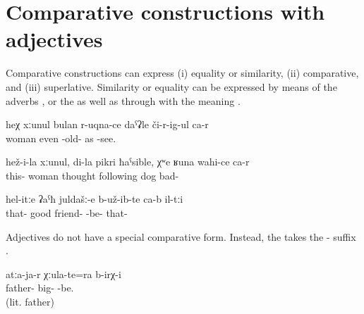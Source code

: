 
\section{Comparative constructions with adjectives}
\label{sec:Comparison}

Comparative constructions can express (i) equality or similarity, (ii) comparative, and (iii) superlative. Similarity or equality can be expressed by means of the adverbs   ,   or the    as well as through  with the meaning  .

\begin{exe}
	\ex	\label{ex:There is even a woman who looks old}
	\gll	heχ	xːunul	bulan	r-uqna-ce	daˁʡle	či-r-ig-ul ca-r \\
			woman	even	-old-	as	-see.  \\
	\glt	{}

	\ex	\label{ex:His wife, in my mind, is bad like a dog}
	\gll	hež-i-la	xːunul,	di-la	pikri	ħaˁsible, χʷe	ʁuna	wahi-ce	ca-r \\
		this-	woman		thought	following	dog		bad-	 \\
	\glt	{}

	\ex	\label{ex:They were such good friends}
	\gll	hel-itːe	ʡaˁħ	juldašː-e	b-už-ib-te ca-b	il-tːi \\
		that-	good	friend-	-be- 	that- \\
	\glt	{}
\end{exe}

Adjectives do not have a special comparative form. Instead, the  takes the - suffix . 

\begin{exe}
	\ex	\label{ex:There were (brothers) older than grandfather}
	\gll	atːa-ja-r	χːula-te=ra	b-irχ-i \\
		father- 	big-	-be. \\
	\glt	{} (lit. father)
\end{exe}

